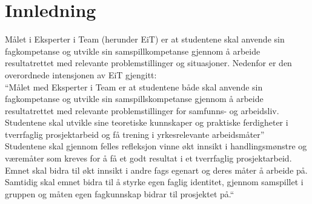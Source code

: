 \section{Innledning}
Målet i Eksperter i Team (herunder EiT) er at studentene skal anvende
sin fagkompetanse og utvikle sin samspillkompetanse gjennom å arbeide
resultatrettet med relevante problemstillinger og situasjoner. Nedenfor
er den overordnede intensjonen av EiT gjengitt:\\

``Målet med Eksperter i Team er at studentene både skal anvende sin
fagkompetanse og utvikle sin samspillskompetanse gjennom å arbeide
resultatrettet med relevante problemstillinger for samfunns- og
arbeidsliv. Studentene skal utvikle sine teoretiske kunnskaper og
praktiske ferdigheter i tverrfaglig prosjektarbeid og få trening i
yrkesrelevante arbeidsmåter''\\

Studentene skal gjennom felles refleksjon vinne økt innsikt i
handlingsmønstre og væremåter som kreves for å få et godt resultat i et
tverrfaglig prosjektarbeid. Emnet skal bidra til økt innsikt i andre
fags egenart og deres måter å arbeide på. Samtidig skal emnet bidra til
å styrke egen faglig identitet, gjennom samspillet i gruppen og måten
egen fagkunnskap bidrar til prosjektet på.``

